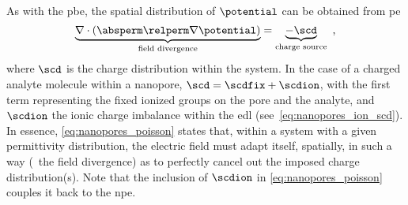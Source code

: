 As with the \gls{pbe}, the spatial distribution of $\potential$ can be obtained from \gls{pe}
%
\begin{equation}\label{eq:nanopores_poisson}
  \underbrace { \nabla \cdot \left(\absperm \relperm \nabla \potential \right) }_{\text{field divergence}}
  = \underbrace{ - \scd }_{\text{charge source}}
  \text{ ,}
\end{equation}
%
where $\scd$ is the charge distribution within the system. In the case of a charged analyte molecule within a
nanopore, $\scd = \scdfix + \scdion$, with the first term representing the fixed ionized groups on the pore
and the analyte, and $\scdion$ the ionic charge imbalance within the \gls{edl}
(see~\cref{eq:nanopores_ion_scd}). In essence, \cref{eq:nanopores_poisson} states that, within a system with a
given permittivity distribution, the electric field must adapt itself, spatially, in such a way (\ie~the field
divergence) as to perfectly cancel out the imposed charge distribution(s). Note that the inclusion of
$\scdion$ in \cref{eq:nanopores_poisson} couples it back to the \gls{npe}.

